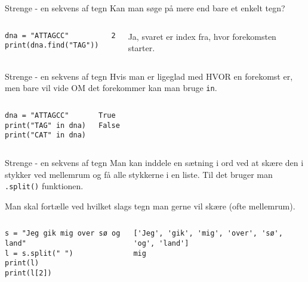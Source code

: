 \documentclass[main.tex]{subfiles}
\begin{document}
\begin{frame}[fragile]{Strenge - en sekvens af tegn}
	Kan man søge på mere end bare et enkelt tegn?
	\begin{columns}
	\begin{lstlisting}[style=python]
dna = "ATTAGCC"
print(dna.find("TAG"))
	\end{lstlisting}
		
	\pause
	\begin{lstlisting}[style=python]
2
	\end{lstlisting}
	Ja, svaret er index fra, hvor forekomsten starter.
	\end{columns}	
\end{frame}

\begin{frame}[fragile]{Strenge - en sekvens af tegn}
	Hvis man er ligeglad med HVOR en forekomst er, men bare vil vide OM det forekommer kan man bruge \texttt{in}.
	\begin{columns}
		\column{0.4\textwidth}
		\begin{lstlisting}[style=python]
dna = "ATTAGCC"
print("TAG" in dna)
print("CAT" in dna)
		\end{lstlisting}
		
		\pause
		\column{0.4\textwidth}
		\begin{lstlisting}[style=python]
True
False
		\end{lstlisting}
	\end{columns}
\end{frame}

\begin{frame}[fragile]{Strenge - en sekvens af tegn}
	Man kan inddele en sætning i ord ved at skære den i stykker ved mellemrum og få alle stykkerne i en liste. Til det bruger man \texttt{.split()} funktionen. 
	
	\pause
	Man skal fortælle ved hvilket slags tegn man gerne vil skære (ofte mellemrum).
	\begin{columns}
		\begin{lstlisting}[style=python]
s = "Jeg gik mig over sø og land"
l = s.split(" ")
print(l)
print(l[2])
		\end{lstlisting}
		
		\pause
		\begin{lstlisting}[style=python]
['Jeg', 'gik', 'mig', 'over', 'sø', 'og', 'land']
mig
		\end{lstlisting}
	\end{columns}
\end{frame}
\end{document}
